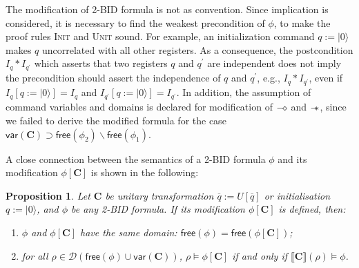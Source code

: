 \documentclass[conference,compsoc, 10pt]{IEEEtran}
\newtheorem{proposition}{Proposition}[section]
\newcommand {\qI} {{q:=|0\rangle}}
\newcommand {\qU} {{\overline{q}:=U[\overline{q}]}}
\newcommand {\cD } {{\mathcal{D}}}
\newcommand {\id } {{I}}
\newcommand {\V }[1] {{\mathsf{free}{\left(#1\right)}}}
\newcommand {\var } {\mathsf{var}}
\newcommand {\prog } {{\mathbf{C}}}
\newcommand {\sepimp} {\mathrel{-\mkern-6mu*}}
\newcommand {\sem}[1] {\llbracket#1\rrbracket}
\newcommand {\sdimp} {\mathrel{-\mkern-2.5mu\diamond}}
\begin{document}
\begin{appendices}
		The modification of 2-BID formula is not as convention. Since implication is considered, it is necessary to find the weakest precondition of $\phi$, to make the proof rules \textsc{Init} and \textsc{Unit} sound. For example, an initialization command $\qI$ makes $q$ uncorrelated with all other registers. As a consequence, the postcondition $\id_{q}\ast\id_{q^\prime}$ which asserts that two registers $q$ and $q^\prime$ are independent does not imply the precondition should assert the independence of $q$ and $q^\prime$, e.g., $\id_{q}\ast\id_{q^\prime}$, even if $\id_{q}[\qI] = \id_{q}$ and $\id_{q^\prime}[\qI] = \id_{q^\prime}$. In addition, the assumption of command variables and domains is declared for modification of $\sdimp$ and $\sepimp$, since we failed to derive the modified formula for the case $\var(\prog)\supset\V{\phi_2}\backslash\V{\phi_1}$.
		
		A close connection between the semantics of a 2-BID formula $\phi$ and its modification $\phi[\prog]$ is shown in the   following:  
		
		\begin{proposition}
			\label{pro modification 2BID}
			Let $\prog$ be unitary transformation $\qU$ or initialisation $\qI$, and $\phi$ be any 2-BID formula. If its modification  $\phi[\prog]$ is defined, then:
			\begin{enumerate}
				\item $\phi$ and $\phi[\prog]$ have the same domain: $\V{\phi} = \V{\phi[\prog]}$;
				\item for all $\rho\in\cD(\V{\phi}\cup\var(\prog))$, $\rho\models \phi[\prog]$ if and only if $\sem{\prog}(\rho)\models \phi$.
			\end{enumerate}
		\end{proposition}
		

\end{appendices}
\end{document}
